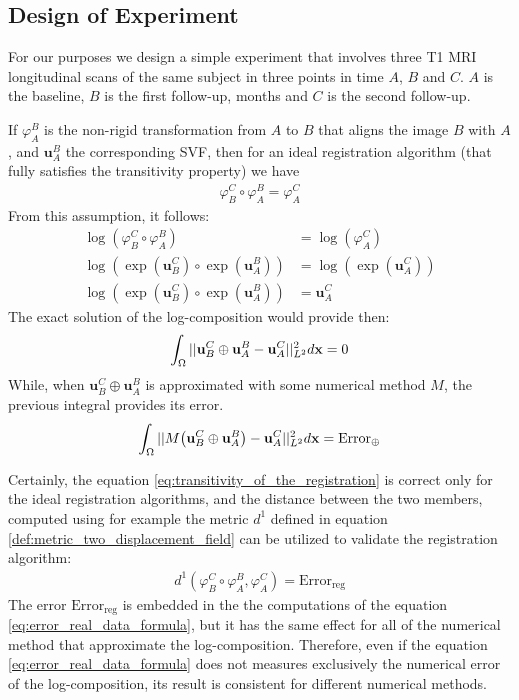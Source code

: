\subsection{Design of Experiment}
For our purposes we design a simple experiment that involves three T1 MRI longitudinal scans of the same subject in three points in time $A$, $B$ and $C$. $A$ is the baseline, $B$ is the first follow-up, months and $C$ is the second follow-up.

If $\varphi_{A}^{B}$ is the non-rigid transformation from $A$ to $B$ that aligns the image $B$ with $A$, and $\mathbf{u}_{A}^{B}$ the corresponding SVF, then for an ideal registration algorithm (that fully satisfies the transitivity property) we have
\begin{align}\label{eq:transitivity_of_the_registration}
\varphi_{B}^{C} \circ \varphi_{A}^{B} = \varphi_{A}^{C}  
\end{align}
From this assumption, it follows:
\begin{align*}
\log(\varphi_{B}^{C} \circ \varphi_{A}^{B}) &= \log(\varphi_{A}^{C}  ) \\
\log(\exp(\mathbf{u}_{B}^{C}) \circ \exp(\mathbf{u}_{A}^{B})) &= \log(\exp(\mathbf{u}_{A}^{C}  ) ) \\
\log(\exp(\mathbf{u}_{B}^{C}) \circ \exp(\mathbf{u}_{A}^{B})) &= \mathbf{u}_{A}^{C}  
\end{align*}
The exact solution of the log-composition would provide then:
\begin{align*}
\int_{\Omega} \vert\lvert 
	\mathbf{u}_{B}^{C} \oplus \mathbf{u}_{A}^{B}
	-
	\mathbf{u}_{A}^{C}
 \rvert\vert_{L^2}^{2} d\mathbf{x} 
 =
 0
\end{align*} 
While, when $\mathbf{u}_{B}^{C} \oplus \mathbf{u}_{A}^{B}$ is approximated with some numerical method $M$, the previous integral provides its error.
\begin{align}\label{eq:error_real_data_formula} 
\int_{\Omega} \vert\lvert 
	M\big(\mathbf{u}_{B}^{C} \oplus \mathbf{u}_{A}^{B} \big)
	-
	\mathbf{u}_{A}^{C}
 \rvert\vert_{L^2}^{2} d\mathbf{x} 
=
\text{Error}_{\oplus}
\end{align} 

Certainly, the equation \ref{eq:transitivity_of_the_registration} is correct only for the ideal registration algorithms, and the distance between the two members, computed using for example the metric $d^{1}$ defined in equation \ref{def:metric_two_displacement_field} can be utilized to validate the registration algorithm:
\begin{align*}
d^{1}(\varphi_{B}^{C} \circ \varphi_{A}^{B} ,\varphi_{A}^{C}) 
= 
\text{Error}_{\text{reg}}
\end{align*} 
The error $\text{Error}_{\text{reg}}$ is embedded in the the computations of the equation \ref{eq:error_real_data_formula}, but it has the same effect for all of the numerical method that approximate the log-composition. Therefore, even if the equation \ref{eq:error_real_data_formula} does not measures exclusively the numerical error of the log-composition, its result is consistent for different numerical methods.

